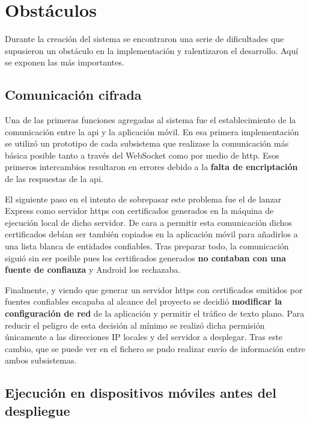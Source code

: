 \chapter{Obstáculos}
\label{ch:obstaculos}

Durante la creación del sistema se encontraron una serie de dificultades que supusieron un obstáculo en la implementación y ralentizaron el desarrollo. Aquí se exponen las más importantes.

\section{Comunicación cifrada}

Una de las primeras funciones agregadas al sistema fue el establecimiento de la comunicación entre la \acrshort{api} y la aplicación móvil. En esa primera implementación se utilizó un prototipo de cada subsistema que realizase la comunicación más básica posible tanto a través del WebSocket como por medio de \acrshort{http}. Esos primeros intercambios resultaron en errores debido a la \textbf{falta de encriptación} de las respuestas de la \acrshort{api}.

El siguiente paso en el intento de sobrepasar este problema fue el de lanzar Express como servidor \acrshort{https} con certificados generados en la máquina de ejecución local de dicho servidor. De cara a permitir esta comunicación dichos certificados debían ser también copiados en la aplicación móvil para añadirlos a una lista blanca de entidades confiables. Tras preparar todo, la comunicación siguió sin ser posible pues los certificados generados \textbf{no contaban con una fuente de confianza} y Android los rechazaba.

Finalmente, y viendo que generar un servidor \acrshort{https} con certificados emitidos por fuentes confiables escapaba al alcance del proyecto se decidió \textbf{modificar la configuración de red} de la aplicación y permitir el tráfico de texto plano. Para reducir el peligro de esta decisión al mínimo se realizó dicha permisión únicamente a las direcciones IP locales y del servidor a desplegar. Tras este cambio, que se puede ver en el fichero  se pudo realizar envío de información entre ambos subsistemas.

\section{Ejecución en dispositivos móviles antes del despliegue}

